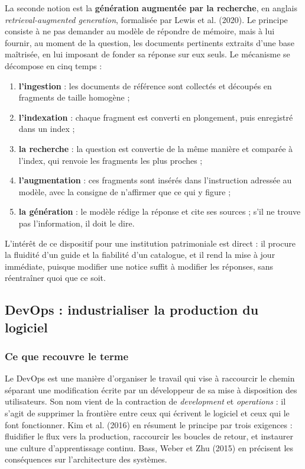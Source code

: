 La seconde notion est la \textbf{génération augmentée par la recherche}, en
anglais \emph{retrieval-augmented generation}, formalisée par Lewis et al.
(2020). Le principe consiste à ne pas demander au modèle de répondre de mémoire,
mais à lui fournir, au moment de la question, les documents pertinents extraits
d'une base maîtrisée, en lui imposant de fonder sa réponse sur eux seuls. Le
mécanisme se décompose en cinq temps :

\begin{enumerate}
  \item \textbf{l'ingestion} : les documents de référence sont collectés et
        découpés en fragments de taille homogène ;
  \item \textbf{l'indexation} : chaque fragment est converti en plongement, puis
        enregistré dans un index ;
  \item \textbf{la recherche} : la question est convertie de la même manière et
        comparée à l'index, qui renvoie les fragments les plus proches ;
  \item \textbf{l'augmentation} : ces fragments sont insérés dans l'instruction
        adressée au modèle, avec la consigne de n'affirmer que ce qui y figure ;
  \item \textbf{la génération} : le modèle rédige la réponse et cite ses
        sources ; s'il ne trouve pas l'information, il doit le dire.
\end{enumerate}

L'intérêt de ce dispositif pour une institution patrimoniale est direct : il
procure la fluidité d'un guide et la fiabilité d'un catalogue, et il rend la
mise à jour immédiate, puisque modifier une notice suffit à modifier les
réponses, sans réentraîner quoi que ce soit.

\subsection{DevOps : industrialiser la production du logiciel}

\subsubsection{Ce que recouvre le terme}

Le DevOps est une manière d'organiser le travail qui vise à raccourcir le
chemin séparant une modification écrite par un développeur de sa mise à
disposition des utilisateurs. Son nom vient de la contraction de
\emph{development} et \emph{operations} : il s'agit de supprimer la frontière
entre ceux qui écrivent le logiciel et ceux qui le font fonctionner. Kim et al.
(2016) en résument le principe par trois exigences : fluidifier le flux vers la
production, raccourcir les boucles de retour, et instaurer une culture
d'apprentissage continu. Bass, Weber et Zhu (2015) en précisent les
conséquences sur l'architecture des systèmes.

